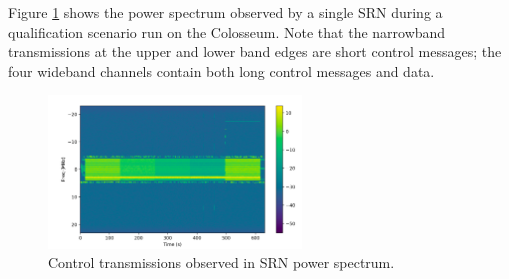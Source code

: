 \documentclass[11pt]{article}
\begin{document}
\begin{enumerate}
     Figure \ref{fg:CCEx} shows the power spectrum observed by a single SRN during a qualification scenario run on the Colosseum.  Note that the narrowband transmissions at the upper and lower band edges are short control messages; the four wideband channels contain both long control messages and data.
     \begin{figure} [htb]
     \centerline{
     \includegraphics[width = 0.6\textwidth]{Figures/CCEx.png}}
     \caption{Control transmissions observed in SRN power spectrum.}
     \label{fg:CCEx}
     \end{figure}


\end{enumerate}
\end{document}
